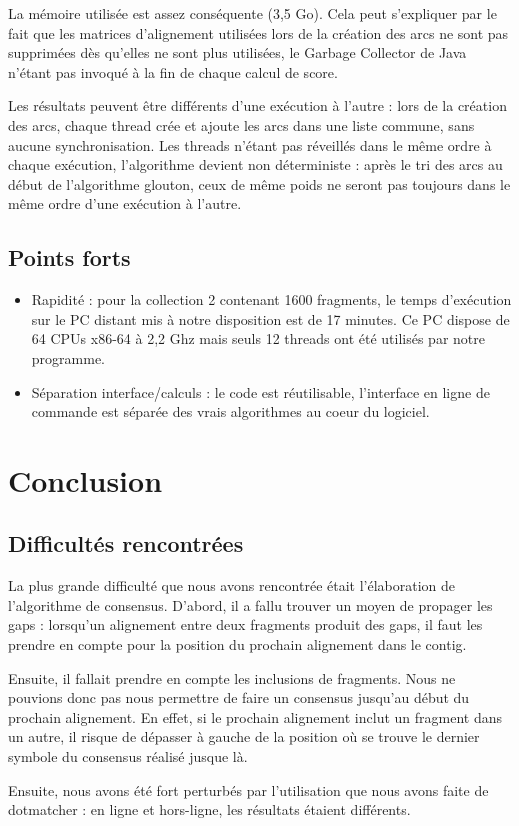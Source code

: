 \documentclass[a4paper, 12pt, titlepage]{article}
\begin{document}
La mémoire utilisée est assez conséquente (3,5 Go).
Cela peut s'expliquer par le fait que les matrices d'alignement utilisées lors
de la création des arcs ne sont pas supprimées dès qu'elles ne sont plus
utilisées, le Garbage Collector de Java n'étant pas invoqué à la fin de chaque calcul de score.

Les résultats peuvent être différents d'une exécution à l'autre :
lors de la création des arcs, chaque thread crée et ajoute les arcs
dans une liste commune, sans aucune synchronisation.
Les threads n'étant pas réveillés dans le même ordre à chaque exécution,
l'algorithme devient non déterministe : après le tri des arcs
au début de l'algorithme glouton, ceux de même poids ne seront pas
toujours dans le même ordre d'une exécution à l'autre.

\subsection*{Points forts}
\begin{itemize}
	\item Rapidité : pour la collection 2 contenant 1600 fragments,
le temps d'exécution sur le PC distant mis à notre disposition est de 17 minutes.
Ce PC dispose de 64 CPUs x86-64 à 2,2 Ghz mais seuls 12 threads
ont été utilisés par notre programme.
	\item Séparation interface/calculs : le code est réutilisable, l'interface
en ligne de commande est séparée des vrais algorithmes au coeur du logiciel.
\end{itemize}

\section{Conclusion}
\subsection{Difficultés rencontrées}
La plus grande difficulté que nous avons rencontrée était l'élaboration de
l'algorithme de consensus.
D'abord, il a fallu trouver un moyen de propager les gaps :
lorsqu'un alignement entre deux fragments produit des gaps, il faut
les prendre en compte pour la position du prochain alignement dans le contig.

Ensuite, il fallait prendre en compte les inclusions de fragments.
Nous ne pouvions donc pas nous permettre de faire un consensus
jusqu'au début du prochain alignement.
En effet, si le prochain alignement inclut un fragment dans un autre, il risque
de dépasser à gauche de la position où se trouve le dernier symbole du
consensus réalisé jusque là.

Ensuite, nous avons été fort perturbés par l'utilisation que nous avons faite
de dotmatcher : en ligne et hors-ligne, les résultats étaient différents.
\end{document}
